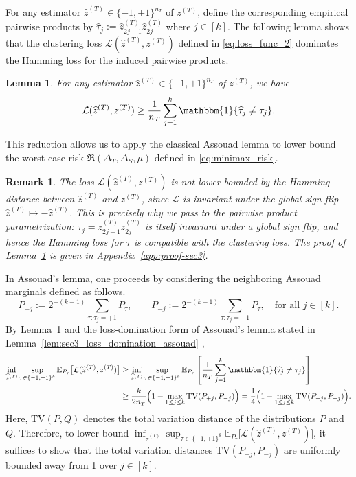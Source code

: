 \documentclass[10pt]{article}
\newtheorem{lemma}{Lemma}
\newtheorem{remark}{Remark}
\newcommand{\Ebb}{\mathbb E}
\newcommand{\wh}{\widehat}
\newcommand{\calL}{\mathcal L}
\newcommand{\TV}{\mathrm{TV}}
\newcommand{\trg}{T}
\newcommand{\nT}{n_{\trg}}
\newcommand{\ztar}{z^{(\trg)}}
\newcommand{\hatztar}{\wh{z}^{(\trg)}}
\newcommand{\DeltaT}{\Delta_{\trg}}
\newcommand{\src}{S}
\newcommand{\DeltaS}{\Delta_{\src}}
\begin{document}
For any estimator $\hatztar\in\{-1,+1\}^{\nT}$ of $\ztar$, define the
corresponding empirical pairwise products by $\wh{\tau}_j:=\hatztar_{2j-1}\hatztar_{2j}$ where $j \in [k]$.
The following lemma shows that the clustering loss $\calL(\hatztar,\ztar)$
defined in \eqref{eq:loss_func_2} dominates the Hamming loss for the induced
pairwise products.
\begin{lemma}
\label{lem:sec3_loss_domination}
For any estimator $\hatztar\in\{-1,+1\}^{\nT}$ of $\ztar$, we have
\[
    \calL(\hatztar,\ztar)
    \ge
    \frac{1}{\nT}\sum_{j=1}^k
    \mathbbm{1}\{\wh{\tau}_j\neq\tau_j\}.
\]
\end{lemma}
This reduction allows us to apply the classical Assouad lemma
\citep{assouad1983deux,Yu1997} to lower bound the worst-case risk
$\mathfrak R(\DeltaT,\DeltaS,\mu)$ defined in \eqref{eq:minimax_risk}.
\begin{remark}
The loss $\calL(\hatztar,\ztar)$ is not lower bounded by the Hamming distance
between $\hatztar$ and $\ztar$, since $\calL$ is invariant under the global sign
flip $\hatztar\mapsto-\hatztar$. This is precisely why we pass to the pairwise
product parametrization: $\tau_j=\ztar_{2j-1}\ztar_{2j}$ is itself invariant
under a global sign flip, and hence the Hamming loss for $\tau$ is compatible
with the clustering loss. The proof of Lemma~\ref{lem:sec3_loss_domination} is
given in Appendix~\ref{app:proof-sec3}.
\end{remark}

In Assouad's lemma, one proceeds by considering the neighboring Assouad marginals defined as follows.
\begin{equation}
    \label{eq:sec3_assouad_marginals}
    P_{+j}:=2^{-(k-1)}\sum_{\tau:\tau_j=+1} P_\tau,
    \qquad
    P_{-j}:=2^{-(k-1)}\sum_{\tau:\tau_j=-1} P_\tau, \quad \mbox{for all $j \in [k]$.}
\end{equation}
By Lemma~\ref{lem:sec3_loss_domination} and the loss-domination form of
Assouad's lemma stated in Lemma~\ref{lem:sec3_loss_domination_assouad}
\citep{assouad1983deux,Yu1997}, 
\begin{align}
\label{eq:sec3_assouad_display}
\inf_{\hatztar}\sup_{\tau\in\{-1,+1\}^k}\Ebb_{P_\tau}\bigl[\calL(\hatztar,\ztar)\bigr]&\ge \inf_{\hatztar}\sup_{\tau\in\{-1,+1\}^k}\Ebb_{P_\tau}\left[\frac{1}{\nT}\sum_{j=1}^k\mathbbm{1}\{\wh{\tau}_j\neq\tau_j\}\right]\\
&\ge \frac{k}{2\nT}\Bigl(1-\max_{1\le j\le k}\TV(P_{+j},P_{-j})\Bigr)=
\frac{1}{4}\Bigl(1-\max_{1\le j\le k}\TV(P_{+j},P_{-j})\Bigr).
\end{align}
Here, $\TV(P,Q)$ denotes the total variation distance of the distributions $P$ and $Q$. Therefore, to lower bound $\inf_{\hatztar}\sup_{\tau\in\{-1,+1\}^k}\Ebb_{P_\tau}\bigl[\calL(\hatztar,\ztar)\bigr]$, it suffices to show that the total variation distances $\TV(P_{+j},P_{-j})$ are uniformly bounded away from 1 over $j \in [k]$.
\end{document}
